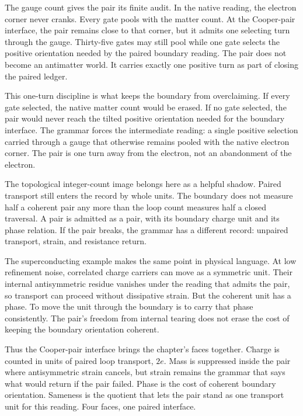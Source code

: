 The gauge count gives the pair its finite audit. In the native reading, the
electron corner never cranks. Every gate pools with the matter count. At the
Cooper-pair interface, the pair remains close to that corner, but it admits
one selecting turn through the gauge. Thirty-five gates may still pool while
one gate selects the positive orientation needed by the paired boundary
reading. The pair does not become an antimatter world. It carries exactly
one positive turn as part of closing the paired ledger.

This one-turn discipline is what keeps the boundary from overclaiming. If
every gate selected, the native matter count would be erased. If no gate
selected, the pair would never reach the tilted positive orientation needed
for the boundary interface. The grammar forces the intermediate reading: a
single positive selection carried through a gauge that otherwise remains
pooled with the native electron corner. The pair is one turn away from the
electron, not an abandonment of the electron.

The topological integer-count image belongs here as a helpful shadow. Paired
transport still enters the record by whole units. The boundary does not
measure half a coherent pair any more than the loop count measures half a
closed traversal. A pair is admitted as a pair, with its boundary charge unit
and its phase relation. If the pair breaks, the grammar has a different
record: unpaired transport, strain, and resistance return.

The superconducting example makes the same point in physical language. At
low refinement noise, correlated charge carriers can move as a symmetric
unit. Their internal antisymmetric residue vanishes under the reading that
admits the pair, so transport can proceed without dissipative strain. But the
coherent unit has a phase. To move the unit through the boundary is to carry
that phase consistently. The pair's freedom from internal tearing does not
erase the cost of keeping the boundary orientation coherent.

Thus the Cooper-pair interface brings the chapter's faces together. Charge
is counted in units of paired loop transport, \(2e\). Mass is suppressed
inside the pair where antisymmetric strain cancels, but strain remains the
grammar that says what would return if the pair failed. Phase is the cost of
coherent boundary orientation. Sameness is the quotient that lets the pair
stand as one transport unit for this reading. Four faces, one paired
interface.

